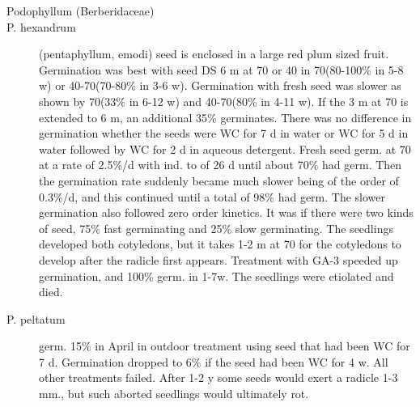 \begin{description}
\item[Podophyllum (Berberidaceae)]
\item[P. hexandrum] (pentaphyllum, emodi) seed is enclosed in a large red plum
sized fruit. Germination was best with seed DS 6 m at 70 or 40 in 70(80-100\% in 5-8
w) or 40-70(70-80\% in 3-6 w). Germination with fresh seed was slower as shown by
70(33\% in 6-12 w) and 40-70(80\% in 4-11 w). If the 3 m at 70 is extended to 6 m, an
additional 35\% germinates. There was no difference in germination whether the
seeds were WC for 7 d in water or WC for 5 d in water followed by WC for 2 d in
aqueous detergent. Fresh seed germ. at 70 at a rate of 2.5\%/d with ind. to of 26 d until
about 70\% had germ. Then the germination rate suddenly became much slower
being of the order of 0.3\%/d, and this continued until a total of 98\% had germ. The
slower germination also followed zero order kinetics. It was if there were two kinds of
seed, 75\% fast germinating and 25\% slow germinating. The seedlings developed
both cotyledons, but it takes 1-2 m at 70 for the cotyledons to develop after the radicle
first appears. Treatment with GA-3 speeded up germination, and 100\% germ. in 1-7w.
The seedlings were etiolated and died.
\item[P. peltatum] germ. 15\% in April in outdoor treatment using seed that had been
WC for 7 d. Germination dropped to 6\% if the seed had been WC for 4 w. All other
treatments failed. After 1-2 y some seeds would exert a radicle 1-3 mm., but such
aborted seedlings would ultimately rot.


\end{description}
